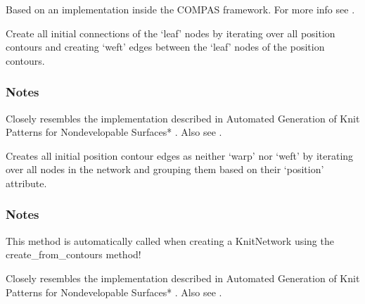 \documentclass[letterpaper,10pt,english]{sphinxmanual}
\begin{document}
\begin{fulllineitems}
\begin{fulllineitems}
Based on an implementation inside the COMPAS framework.
For more info see \sphinxfootnotemark[16].

\end{fulllineitems}


\begin{fulllineitems}
\label{\detokenize{cockatoo:cockatoo.KnitNetwork.initialize_leaf_connections}}
Create all initial connections of the ‘leaf’ nodes by iterating over
all position contours and creating ‘weft’ edges between the ‘leaf’
nodes of the position contours.
\subsubsection*{Notes}

Closely resembles the implementation described in Automated Generation
of Knit Patterns for Non\sphinxhyphen{}developable Surfaces* \sphinxfootnotemark[1]. Also see  \sphinxfootnotemark[2].

\end{fulllineitems}


\begin{fulllineitems}
\label{\detokenize{cockatoo:cockatoo.KnitNetwork.initialize_position_contour_edges}}
Creates all initial position contour edges as neither ‘warp’ nor ‘weft’
by iterating over all nodes in the network and grouping them based on
their ‘position’ attribute.
\subsubsection*{Notes}

This method is automatically called when creating a KnitNetwork using
the create\_from\_contours method!

Closely resembles the implementation described in Automated Generation
of Knit Patterns for Non\sphinxhyphen{}developable Surfaces* \sphinxfootnotemark[1]. Also see  \sphinxfootnotemark[2].


\end{fulllineitems}
\end{fulllineitems}
\end{document}
